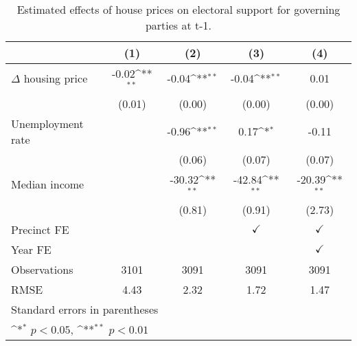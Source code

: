 \begin{table}[htbp]\centering
\def\sym#1{\ifmmode^{#1}\else\(^{#1}\)\fi}
\caption{Estimated effects of house prices on electoral support for governing parties at t-1.} \label{tab3}
\begin{tabular}{l*{4}{c}}
\hline\hline
                    &\multicolumn{1}{c}{(1)}        &\multicolumn{1}{c}{(2)}        &\multicolumn{1}{c}{(3)}        &\multicolumn{1}{c}{(4)}        \\
\hline
$\Delta$ housing price&       -0.02\sym{**}&       -0.04\sym{**}&       -0.04\sym{**}&        0.01        \\
                    &      (0.01)        &      (0.00)        &      (0.00)        &      (0.00)        \\
[1em]
Unemployment rate   &                    &       -0.96\sym{**}&        0.17\sym{*} &       -0.11        \\
                    &                    &      (0.06)        &      (0.07)        &      (0.07)        \\
[1em]
Median income       &                    &      -30.32\sym{**}&      -42.84\sym{**}&      -20.39\sym{**}\\
                    &                    &      (0.81)        &      (0.91)        &      (2.73)        \\
[1em]
\hline Precinct FE  &                    &                    &$\checkmark$        &$\checkmark$        \\
[1em]
Year FE             &                    &                    &                    &$\checkmark$        \\
\hline
Observations        &        3101        &        3091        &        3091        &        3091        \\
RMSE                &        4.43        &        2.32        &        1.72        &        1.47        \\
\hline\hline
\multicolumn{5}{l}{\footnotesize Standard errors in parentheses}\\
\multicolumn{5}{l}{\footnotesize \sym{*} \(p<0.05\), \sym{**} \(p<0.01\)}\\
\end{tabular}
\end{table}
